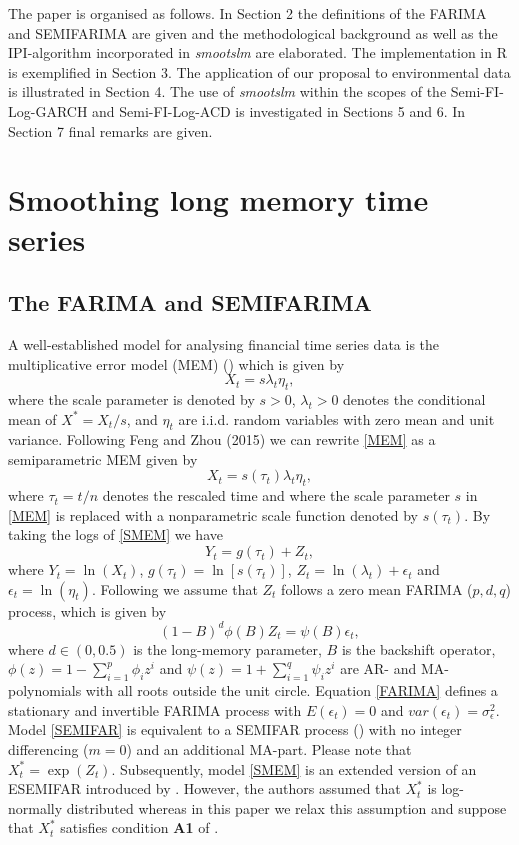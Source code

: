 \documentclass[12pt]{article}
\begin{document}
The paper is organised as follows. In Section 2 the definitions of the FARIMA and SEMIFARIMA are given and the methodological background as well as the IPI-algorithm incorporated in \textit{smootslm} are elaborated. The implementation in R is exemplified in Section 3. The application of our proposal to environmental data is illustrated in Section 4. The use of \textit{smootslm} within the scopes of the Semi-FI-Log-GARCH and Semi-FI-Log-ACD is investigated in Sections 5 and 6. In Section 7 final remarks are given.

\section{Smoothing long memory time series}

\subsection{The FARIMA and SEMIFARIMA}
A well-established model for  analysing financial time series data is the multiplicative error model (MEM) (\cite{engle2002dynamic})  which is given by 
\begin{equation}
\label{MEM}
X_t=s \lambda_t \eta_t,
\end{equation}
where the scale parameter is denoted by $s >0$, $\lambda_t >0$ denotes the conditional mean of $X^*=X_t/s$, and $\eta_t$ are i.i.d. random variables with zero mean and unit variance. Following Feng and Zhou (2015) we can rewrite \eqref{MEM} as a semiparametric MEM given by
\begin{equation}
\label{SMEM}
X_t=s(\tau_t)\lambda_t \eta_t,
\end{equation}   
where $\tau_t=t/n$ denotes the rescaled time and where the scale parameter $s$ in \eqref{MEM} is replaced with a nonparametric scale function denoted by $s(\tau_t)$. 
By taking the logs of \eqref{SMEM} we have
\begin{equation}
\label{SEMIFAR}
Y_t=g(\tau_t) + Z_t,
\end{equation}
where $Y_t=\ln(X_t)$, $g(\tau_t)=\ln[s(\tau_t)]$, $Z_t=\ln(\lambda_t) + \epsilon_t$ and $\epsilon_t=\ln(\eta_t)$. Following \citet{beran2002semifar} we assume that $Z_t$ follows a zero mean FARIMA ($p, d, q$) process, which is given by
\begin{equation}
\label{FARIMA}
(1-B)^d\phi(B)Z_t =\psi(B)\epsilon_t,
\end{equation}
where $d \in (0,0.5)$ is the long-memory parameter, $B$ is the backshift operator, $\phi(z)=1-\sum_{i=1}^{p}\phi_iz^i$ and  $\psi(z)=1+\sum_{i=1}^{q}\psi_iz^i$ are AR- and MA-polynomials with all roots outside the unit circle. Equation \eqref{FARIMA} defines a stationary and invertible FARIMA process with $E(\epsilon_t)=0$ and $var(\epsilon_t)=\sigma^2_{\epsilon}$. Model \eqref{SEMIFAR} is equivalent to a SEMIFAR process (\cite{beran2002semifar}) with no integer differencing ($m=0$) and an additional MA-part. Please note that $X^*_t = \exp(Z_t)$. Subsequently, model \eqref{SMEM} is an extended version of an ESEMIFAR introduced by \citet{beran2015modelling}. However, the authors assumed that $X^*_t$ is log-normally distributed whereas in this paper we relax this assumption and suppose that $X_t^*$ satisfies condition \textbf{A1} of \citet{feng2020fractionally}.
\end{document}
